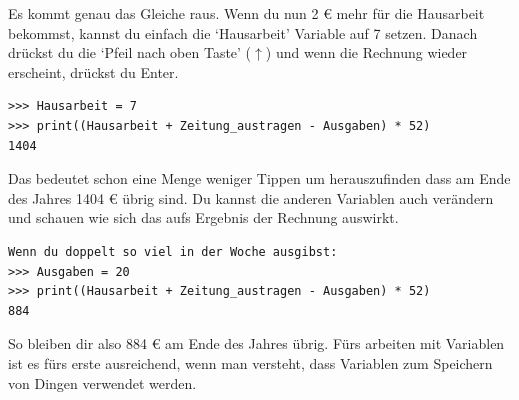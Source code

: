 Es kommt genau das Gleiche raus. Wenn du nun 2 € mehr für die Hausarbeit bekommst, kannst du einfach die `Hausarbeit' Variable auf 7 setzen. Danach drückst du die `Pfeil nach oben Taste' ($\uparrow$) und wenn die Rechnung wieder erscheint, drückst du Enter.

\begin{Verbatim}[frame=single]
>>> Hausarbeit = 7
>>> print((Hausarbeit + Zeitung_austragen - Ausgaben) * 52)
1404
\end{Verbatim}

Das bedeutet schon eine Menge weniger Tippen um herauszufinden dass am Ende des Jahres 1404 € übrig sind. Du kannst die anderen Variablen auch verändern und schauen wie sich das aufs Ergebnis der Rechnung auswirkt.

\begin{Verbatim}[frame=single]
Wenn du doppelt so viel in der Woche ausgibst:
>>> Ausgaben = 20
>>> print((Hausarbeit + Zeitung_austragen - Ausgaben) * 52)
884
\end{Verbatim}

So bleiben dir also 884 € am Ende des Jahres übrig. Fürs arbeiten mit Variablen ist es fürs erste ausreichend, wenn man versteht, dass Variablen zum Speichern von Dingen verwendet werden.

